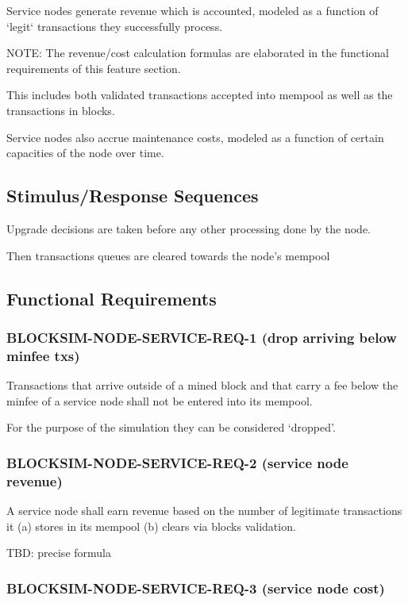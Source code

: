 \documentclass{scrreprt}
\begin{document}
      Service nodes generate revenue which is accounted, modeled as a function
      of `legit` transactions they successfully process.

      NOTE: The revenue/cost calculation formulas are elaborated in the
      functional requirements of this feature section.

      This includes both validated transactions accepted into mempool as well
      as the transactions in blocks.

      Service nodes also accrue maintenance costs, modeled as a function of
      certain capacities of the node over time.

    \subsection{Stimulus/Response Sequences}

      Upgrade decisions are taken before any other processing done by the node.

      Then transactions queues are cleared towards the node's mempool

    \subsection{Functional Requirements}

      \subsubsection{BLOCKSIM-NODE-SERVICE-REQ-1 (drop arriving below minfee txs)}

        Transactions that arrive outside of a mined block and that carry a fee
        below the minfee of a service node shall not be entered into its mempool.

        For the purpose of the simulation they can be considered `dropped'.

      \subsubsection{BLOCKSIM-NODE-SERVICE-REQ-2 (service node revenue)}

        A service node shall earn revenue based on the number of legitimate
        transactions it (a) stores in its mempool  (b) clears via blocks
        validation.

        TBD: precise formula

      \subsubsection{BLOCKSIM-NODE-SERVICE-REQ-3 (service node cost)}
\end{document}
